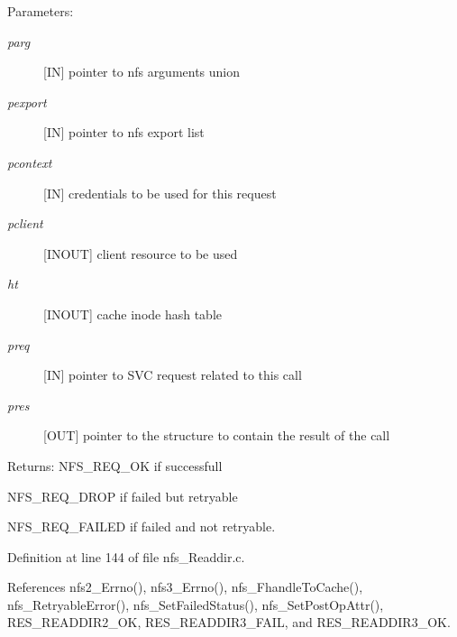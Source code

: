 \begin{Desc}
\item[Parameters:]
\begin{description}
\item[{\em parg}][IN] pointer to nfs arguments union \item[{\em pexport}][IN] pointer to nfs export list \item[{\em pcontext}][IN] credentials to be used for this request \item[{\em pclient}][INOUT] client resource to be used \item[{\em ht}][INOUT] cache inode hash table \item[{\em preq}][IN] pointer to SVC request related to this call \item[{\em pres}][OUT] pointer to the structure to contain the result of the call\end{description}
\end{Desc}
\begin{Desc}
\item[Returns:]NFS\_\-REQ\_\-OK if successfull \par
 NFS\_\-REQ\_\-DROP if failed but retryable \par
 NFS\_\-REQ\_\-FAILED if failed and not retryable. \end{Desc}


Definition at line 144 of file nfs\_\-Readdir.c.

References nfs2\_\-Errno(), nfs3\_\-Errno(), nfs\_\-Fhandle\-To\-Cache(), nfs\_\-Retryable\-Error(), nfs\_\-Set\-Failed\-Status(), nfs\_\-Set\-Post\-Op\-Attr(), RES\_\-READDIR2\_\-OK, RES\_\-READDIR3\_\-FAIL, and RES\_\-READDIR3\_\-OK.